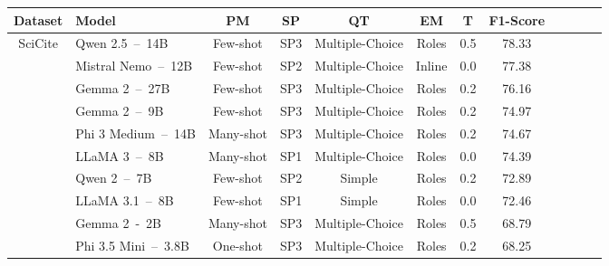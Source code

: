 

\begin{table*}[t]
    \centering
    \footnotesize
    \begin{tabular}{clcccccccccc}
        \hline
        \textbf{Dataset}            & \textbf{Model}            & \textbf{PM}   & \textbf{SP}     & \textbf{QT}         & \textbf{EM}       & \textbf{T}    & \textbf{F1-Score}\\
        \hline
        \multirow{12}{*}{SciCite}   & Qwen 2.5~--~14B           & Few-shot      & SP3             & Multiple-Choice     & Roles             & 0.5           & 78.33  \\
                                    & Mistral Nemo~--~12B       & Few-shot      & SP2             & Multiple-Choice     & Inline            & 0.0           & 77.38  \\
                                    & Gemma 2~--~27B            & Few-shot      & SP3             & Multiple-Choice     & Roles             & 0.2           & 76.16  \\
                                    & Gemma 2~--~9B             & Few-shot      & SP3             & Multiple-Choice     & Roles             & 0.2           & 74.97  \\
                                    & Phi 3 Medium~--~14B       & Many-shot     & SP3             & Multiple-Choice     & Roles             & 0.2           & 74.67  \\
                                    & LLaMA 3~--~8B             & Many-shot     & SP1             & Multiple-Choice     & Roles             & 0.0           & 74.39  \\
                                    & Qwen 2~--~7B              & Few-shot      & SP2             & Simple              & Roles             & 0.2           & 72.89  \\
                                    & LLaMA 3.1~--~8B           & Few-shot      & SP1             & Simple              & Roles             & 0.0           & 72.46  \\
                                    & Gemma 2~-~2B              & Many-shot     & SP3             & Multiple-Choice     & Roles             & 0.5           & 68.79  \\
                                    & Phi 3.5 Mini~--~3.8B      & One-shot      & SP3             & Multiple-Choice     & Roles             & 0.2           & 68.25  \\

\end{tabular}
\end{table*}
